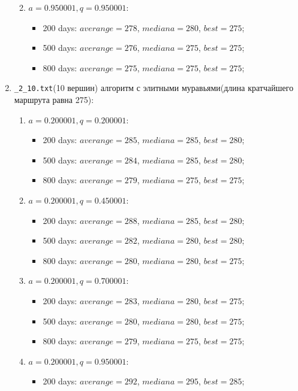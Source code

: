 \begin{enumerate}
\begin{enumerate}
\begin{itemize}
		\end{itemize}
		\item $a= 0.950001, q= 0.950001$:
		\begin{itemize}
			\item 200 days: $averange = 278$, $mediana = 280$, $best = 275$;
			\item 500 days: $averange = 276$, $mediana = 275$, $best = 275$;
			\item 800 days: $averange = 275$, $mediana = 275$, $best = 275$;
		\end{itemize}
	\end{enumerate}
	\item \texttt{\_2\_10.txt}(10 вершин) алгоритм с элитными муравьями(длина кратчайшего маршрута равна 275):
	\begin{enumerate}
		\item $a= 0.200001, q= 0.200001$:
		\begin{itemize}
			\item 200 days: $averange = 285$, $mediana = 285$, $best = 280$;
			\item 500 days: $averange = 284$, $mediana = 285$, $best = 280$;
			\item 800 days: $averange = 279$, $mediana = 275$, $best = 275$;
		\end{itemize}
		\item $a= 0.200001, q= 0.450001$:
		\begin{itemize}
			\item 200 days: $averange = 288$, $mediana = 285$, $best = 280$;
			\item 500 days: $averange = 282$, $mediana = 280$, $best = 280$;
			\item 800 days: $averange = 280$, $mediana = 280$, $best = 275$;
		\end{itemize}
		\item $a= 0.200001, q= 0.700001$:
		\begin{itemize}
			\item 200 days: $averange = 283$, $mediana = 280$, $best = 275$;
			\item 500 days: $averange = 280$, $mediana = 280$, $best = 275$;
			\item 800 days: $averange = 279$, $mediana = 275$, $best = 275$;
		\end{itemize}
		\item $a= 0.200001, q= 0.950001$:
		\begin{itemize}
			\item 200 days: $averange = 292$, $mediana = 295$, $best = 285$;

\end{itemize}
\end{enumerate}
\end{enumerate}
